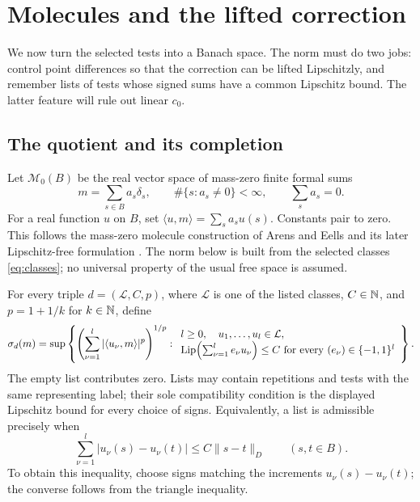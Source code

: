 \section{Molecules and the lifted correction}\label{sec:molecules}

We now turn the selected tests into a Banach space. The norm must do
two jobs: control point differences so that the correction can be
lifted Lipschitzly, and remember lists of tests whose signed sums have
a common Lipschitz bound. The latter feature will rule out linear
\(c_0\).

\subsection{The quotient and its completion}

Let \(\mathcal M_0(B)\) be the real vector space of mass-zero finite
formal sums
\[
 m=\sum_{s\in B}a_s\delta_s,\qquad
 \#\{s:a_s\ne0\}<\infty,\qquad \sum_s a_s=0.
\]
For a real function \(u\) on \(B\), set
\(\langle u,m\rangle=\sum_s a_su(s)\). Constants pair to zero.
This follows the mass-zero molecule construction of Arens and Eells
\cite{AE56} and its later Lipschitz-free formulation \cite{GK03}.
The norm below is built from the selected classes
\eqref{eq:classes}; no universal property of the usual free space is
assumed.

For every triple \(d=(\mathcal L,C,p)\), where \(\mathcal L\) is one
of the listed classes, \(C\in\mathbb N\), and \(p=1+1/k\) for \(k\in\mathbb N\),
define
\begin{equation}
 \sigma_d(m)=
 \sup\left\{
 \left(\sum_{\nu=1}^l|\langle u_\nu,m\rangle|^p\right)^{1/p}:
 \begin{array}{l}
 l\geq0,\quad u_1,\ldots,u_l\in\mathcal L,\\
 \operatorname{Lip}\!\left(\sum_{\nu=1}^l e_\nu u_\nu\right)\leq C
 \ \text{for every }(e_\nu)\in\{-1,1\}^l
 \end{array}\right\}.                                      \label{eq:sigma}
\end{equation}
The empty list contributes zero. Lists may contain repetitions and
tests with the same representing label; their sole compatibility
condition is the displayed Lipschitz bound for every choice of signs.
Equivalently, a list is admissible precisely when
\begin{equation}
 \sum_{\nu=1}^l|u_\nu(s)-u_\nu(t)|\leq C\|s-t\|_D
                   \qquad(s,t\in B).
 \label{eq:admissible-increments}
\end{equation}
To obtain this inequality, choose signs matching the increments
\(u_\nu(s)-u_\nu(t)\); the converse follows from the triangle inequality.

